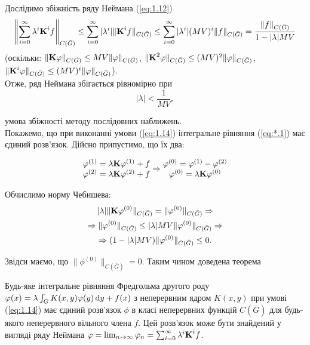 Дослідимо збіжність ряду Неймана (\ref{eq:1.12})
\begin{equation}
	\label{eq:1.13}
	\left\| \Sum_{i = 0}^\infty \lambda^i \bf{K}^i f \right\|_{C(\bar G)} \le \Sum_{i = 0}^\infty |\lambda^i| \| \bf{K}^i f \|_{C(\bar G)} \le \Sum_{i = 0}^\infty |\lambda^i|(MV)^i \| f \|_{C(\bar G)} = \dfrac{\|f\|_{C(\bar G)}}{1 - |\lambda| MV}
\end{equation}
(оскільки: $\| \bf{K} \phi\|_{C(\bar G)} \le MV \|\phi\|_{C(\bar G)}$, $\|\bf{K}^2\phi\|_{C(\bar G)} \le (MV)^2 \|\phi\|_{C(\bar G)}$, $\|\bf{K}^i\phi\|_{C(\bar G)} \le (MV)^i \|\phi\|_{C(\bar G)}$). \\

Отже, ряд Неймана збігається рівномірно при 
\begin{equation}
	\label{eq:1.14}
	|\lambda| < \dfrac{1}{MV},
\end{equation} 

умова збіжності методу послідовних наближень. \\

Покажемо, що при виконанні умови (\ref{eq:1.14}) інтегральне рівняння (\ref{eq:*.1}) має єдиний розв’язок. Дійсно припустимо, що їх два:

\begin{equation*}
	\begin{matrix}
		\phi^{(1)} = \lambda \bf{K} \phi^{(1)} + f \\
		\phi^{(2)} = \lambda \bf{K} \phi^{(2)} + f
	\end{matrix}
	\Rightarrow
	\begin{matrix}
		\phi^{(0)} = \phi^{(1)} - \phi^{(2)}  \\
		\phi^{(0)} = \lambda \bf{K} \phi^{(0)}
	\end{matrix}
\end{equation*}

Обчислимо норму Чебишева: 
\begin{multline*} 
	|\lambda| \|\bf{K} \phi^{(0)}\|_{C(\bar G)} = \| \phi^{(0)} \|_{C(\bar G)} \Rightarrow \\
	\Rightarrow \| \phi^{(0)} \|_{C(\bar G)} \le |\lambda| MV \|\phi^{(0)}\|_{C(\bar G)} \Rightarrow \\
	\Rightarrow (1 - |\lambda|MV)\|\phi^{(0)}\|_{C(\bar G)} \le 0.
\end{multline*}

Звідси маємо, що $\|\phi^{(0)}\|_{C(\bar G)} = 0$. Таким чином доведена теорема

\begin{theorem}
	Будь-яке інтегральне рівняння Фредгольма другого роду $\phi(x) = \lambda \int_G K(x, y) \phi(y) \diff y + f(x)$ з неперервним ядром $K(x, y)$ при умові (\ref{eq:1.14}) має єдиний розв’язок $\phi$ в класі неперервних функцій $C(\bar G)$ для будь-якого неперервного вільного члена $f$. Цей розв’язок може бути знайдений у вигляді ряду Неймана $\phi = \lim_{n \to \infty} \phi_n = \sum_{i = 0}^\infty \lambda^i \bf{K}^i f$.
\end{theorem}

